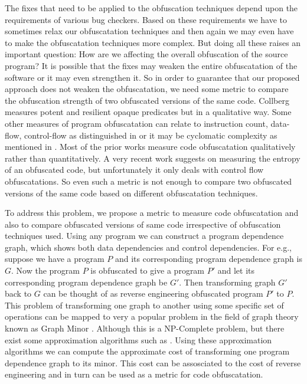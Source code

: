 \documentclass[twocolumn]{article}
\begin{document}
The fixes that need to be applied to the obfuscation techniques depend upon the requirements of various bug checkers. Based on these requirements we have to sometimes relax our 
obfuscatation techniques and then again we may even have to make the obfuscatation techniques more complex. But doing all these raises an important question: How are we affecting the 
overall obfuscation of the source program? It is possible that the fixes may weaken the entire obfuscatation of the software or it may even strengthen it. So in order to guarantee that
 our proposed approach does not weaken the obfuscatation, we need some metric to compare the obfuscation strength of two obfuscated versions of the same code. Collberg \cite{collberg} 
measures potent and resilient opaque predicates but in a qualitative way. Some other measures of program obfuscatation can relate to instruction count, data-flow, control-flow as 
distinguished in \cite{sutter} or it may be cyclomatic complexity as mentioned in \cite{McCabe}. Most of the prior works measure code obfuscatation qualitatively rather than 
quantitatively. A very recent work \cite{entropy} suggests on measuring the entropy of an obfuscated code, but unfortunately it only deals with control flow obfuscatations. So even such 
a metric is not enough to compare two obfuscated versions of the same code based on different obfuscatation techniques.

To address this problem, we propose a metric to measure code obfuscatation and also to compare obfuscated versions of same code irrespective of obfuscation techniques used. Using any 
program we can construct a program dependence graph, which shows both data dependencies and control dependencies. For e.g., suppose we have a program $P$ and its corresponding program 
dependence graph is $G$. Now the program $P$ is obfuscated to give a program $P'$ and let its corresponding program dependence graph be $G'$. Then transforming graph $G'$ back to $G$ can be thought 
of as reverse engineering obfuscated program $P'$ to $P$. This problem of transforming one graph to another using some specific set of operations can be mapped to very a popular problem in 
the field of graph theory known as Graph Minor \cite{graphminor}. Although this is a NP-Complete problem, but there exist some approximation algorithms such as \cite{Demaine05}. Using 
these approximation algorithms we can compute the approximate cost of transforming one program dependence graph to its minor. This cost can be assosciated to the cost of reverse 
engineering and in turn can be used as a metric for code obfuscatation.
\end{document}
